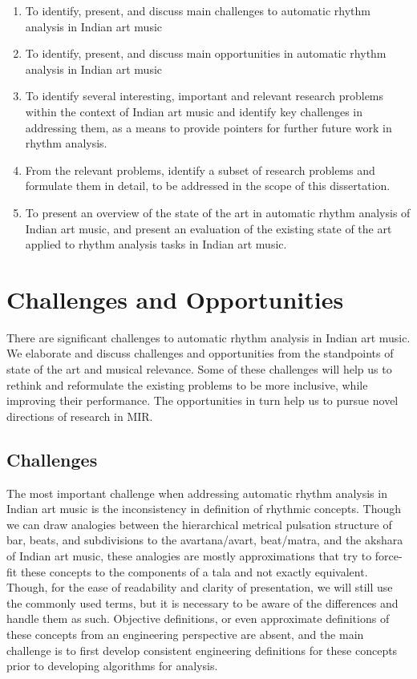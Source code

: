 \begin{enumerate}[leftmargin=*]
	\item To identify, present, and discuss main challenges to automatic rhythm analysis in Indian art music
	\item To identify, present, and discuss main opportunities in automatic rhythm analysis in Indian art music
	\item To identify several interesting, important and relevant research problems within the context of Indian art music and identify key challenges in addressing them, as a means to provide pointers for further future work in rhythm analysis. 
	\item From the relevant problems, identify a subset of research problems and formulate them in detail, to be addressed in the scope of this dissertation. 
	\item To present an overview of the state of the art in automatic rhythm analysis of Indian art music, and present an evaluation of the existing state of the art applied to rhythm analysis tasks in Indian art music. 
\end{enumerate}
%
\section{Challenges and Opportunities}\label{sec:probdef:chopp}
There are significant challenges to automatic rhythm analysis in Indian art music. We elaborate and discuss challenges and opportunities from the standpoints of state of the art and musical relevance. Some of these challenges will help us to rethink and reformulate the existing problems to be more inclusive, while improving their performance. The opportunities in turn help us to pursue novel directions of research in \gls{MIR}. 
\subsection{Challenges}\label{sec:probdef:challenges}
The most important challenge when addressing automatic rhythm analysis in Indian art music is the inconsistency in definition of rhythmic concepts. Though we can draw analogies between the hierarchical metrical pulsation structure of bar, beats, and subdivisions to the \gls{avartana}/\gls{avart}, beat/\gls{matra}, and the \gls{akshara} of Indian art music, these analogies are mostly approximations that try to force-fit these concepts to the components of a \gls{tala} and not exactly equivalent. Though, for the ease of readability and clarity of presentation, we will still use the commonly used terms, but it is necessary to be aware of the differences and handle them as such. Objective definitions, or even approximate definitions of these concepts from an engineering perspective are absent, and the main challenge is to first develop consistent engineering definitions for these concepts prior to developing algorithms for analysis. 


